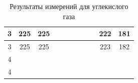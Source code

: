 \documentclass[a4paper, 12pt]{article}
\begin{document}
\begin{table}[H]
\begin{tabular}{|c|cc|cc|cc|cc|cc|}
                    3 & \multicolumn{1}{c|}{225} & 225 & \multicolumn{1}{c|}{} & & \multicolumn{1}{c|}{} & & \multicolumn{1}{c|}{} & & \multicolumn{1}{c|}{222} & 181 \\ \hline
                    
                    3 & \multicolumn{1}{c|}{225} & 225 & \multicolumn{1}{c|}{} & & \multicolumn{1}{c|}{} & & \multicolumn{1}{c|}{} & & \multicolumn{1}{c|}{223} & 182      \\ \hline
                    
                    4 & \multicolumn{1}{c|}{} & & \multicolumn{1}{c|}{} & & \multicolumn{1}{c|}{} & & \multicolumn{1}{c|}{} & & \multicolumn{1}{c|}{} & \\ \hline
                    
                    4 & \multicolumn{1}{c|}{} & & \multicolumn{1}{c|}{} & & \multicolumn{1}{c|}{} & & \multicolumn{1}{c|}{} & & \multicolumn{1}{c|}{} & \\ \hline
                    
                \end{tabular}
                \caption{Результаты измерений для углекислого газа}
                \label{tab:CO2_1}
            \end{table}
                
\end{document}
